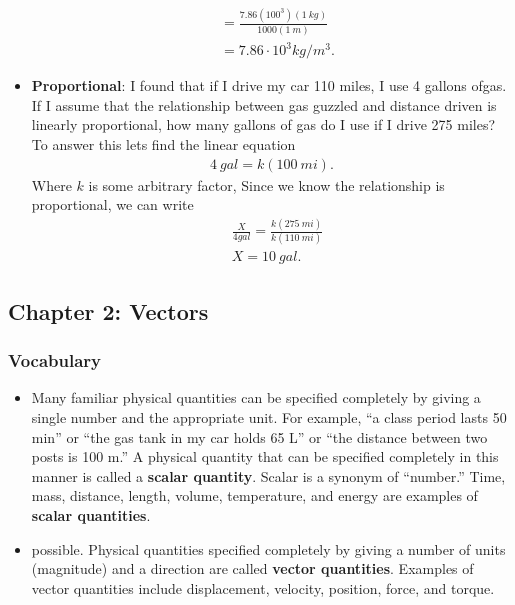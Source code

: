 \documentclass{report}
\begin{document}
\begin{itemize}
\begin{align*}
            &= \frac{7.86(100^{3})(1\ kg)}{1000(1\ m)} \\
            &=7.86 \cdot 10^{3} kg/m^{3}
        .\end{align*}
    \item \textbf{Proportional}: I found that if I drive my car 110 miles, I use 4 gallons ofgas. If I assume that the relationship between gas guzzled and distance driven is linearly proportional, how many gallons of gas do I use if I drive 275 miles?
        \bigbreak \noindent 
        To answer this lets find the linear equation
        \begin{align*}
            4\ gal = k(100\ mi)
        .\end{align*}
        Where $k$ is some arbitrary factor, Since we know the relationship is proportional, we can write 
        \begin{align*}
            &\frac{X}{4 gal} = \frac{k(275\ mi)}{k(110\ mi)} \\
            &X=10\ gal
        .\end{align*}

    \end{itemize}

    \pagebreak 
    \subsection{Chapter 2: Vectors}

    \smallbreak \noindent
    \subsubsection{Vocabulary}
    \begin{itemize}
        \item Many familiar physical quantities can be specified completely by giving a single number and the appropriate unit. For example, “a class period lasts 50 min” or “the gas tank in my car holds 65 L” or “the distance between two posts is 100 m.” A physical quantity that can be specified completely in this manner is called a \textbf{scalar quantity}. Scalar is a synonym of “number.” Time, mass, distance, length, volume, temperature, and energy are examples of \textbf{scalar quantities}.
        \item possible. Physical quantities specified completely by giving a number of units (magnitude) and a direction are called \textbf{vector quantities}. Examples of vector quantities include displacement, velocity, position, force, and torque.
    \end{itemize}
\end{document}

